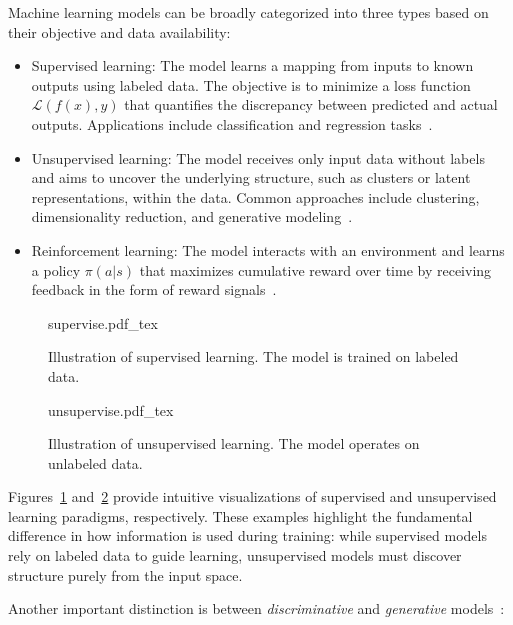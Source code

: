 Machine learning models can be broadly categorized into three types based on their objective and data availability:

\begin{itemize}
\item Supervised learning: The model learns a mapping from inputs to known outputs using labeled data. The objective is to minimize a loss function $\mathcal{L}(f(x), y)$ that quantifies the discrepancy between predicted and actual outputs. Applications include classification and regression tasks~\cite{hastie2009elements}.

\item Unsupervised learning: The model receives only input data without labels and aims to uncover the underlying structure, such as clusters or latent representations, within the data. Common approaches include clustering, dimensionality reduction, and generative modeling~\cite{bishop2006pattern}.

\item Reinforcement learning: The model interacts with an environment and learns a policy $\pi(a|s)$ that maximizes cumulative reward over time by receiving feedback in the form of reward signals~\cite{sutton2018reinforcement}.
\end{itemize}

\begin{figure}[h!]
	\centering
    \def\svgwidth{350pt}
    \fontsize{8pt}{8pt}
 	{supervise.pdf_tex} 	 	
	\caption[Illustration of supervised learning]{Illustration of supervised learning. The model is trained on labeled data.}
	\label{fig:supervise}
\end{figure}
\begin{figure}[h!]
	\centering
    \def\svgwidth{350pt}
    \fontsize{8pt}{8pt}
 	{unsupervise.pdf_tex} 	 	
	\caption[Illustration of unsupervised learning]{Illustration of unsupervised learning. The model operates on unlabeled data.}
	\label{fig:unsupervise}
\end{figure}

Figures~\ref{fig:supervise} and~\ref{fig:unsupervise} provide intuitive visualizations of supervised and unsupervised learning paradigms, respectively. These examples highlight the fundamental difference in how information is used during training: while supervised models rely on labeled data to guide learning, unsupervised models must discover structure purely from the input space.

Another important distinction is between \textit{discriminative} and \textit{generative} models~\cite{Murphy}:

